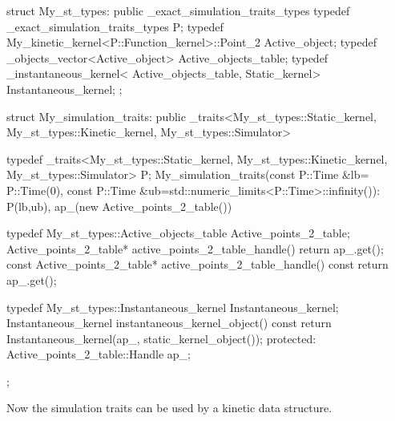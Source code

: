 \begin{ccExampleCode}
struct My_st_types: public _exact_simulation_traits_types {
  typedef _exact_simulation_traits_types P;
  typedef My_kinetic_kernel<P::Function_kernel>::Point_2 Active_object;
  typedef _objects_vector<Active_object> Active_objects_table;
  typedef _instantaneous_kernel< Active_objects_table,
							 Static_kernel> Instantaneous_kernel;
};

struct My_simulation_traits:
  public  _traits<My_st_types::Static_kernel,
			    My_st_types::Kinetic_kernel,
			    My_st_types::Simulator>
{
  typedef  _traits<My_st_types::Static_kernel,
					    My_st_types::Kinetic_kernel,
					    My_st_types::Simulator> P;
  My_simulation_traits(const P::Time &lb= P::Time(0),
		       const P::Time &ub=std::numeric_limits<P::Time>::infinity()): 
    P(lb,ub), 
    ap_(new Active_points_2_table()) {}

  typedef My_st_types::Active_objects_table Active_points_2_table;
  Active_points_2_table* active_points_2_table_handle() {
    return ap_.get();
  }
  const Active_points_2_table* active_points_2_table_handle() const {
    return ap_.get();
  }

  typedef My_st_types::Instantaneous_kernel Instantaneous_kernel;
  Instantaneous_kernel instantaneous_kernel_object() const
  {
    return Instantaneous_kernel(ap_, static_kernel_object());
  }
protected:
  Active_points_2_table::Handle ap_;
};
\end{ccExampleCode}

Now the simulation traits can be used by a kinetic data structure.
